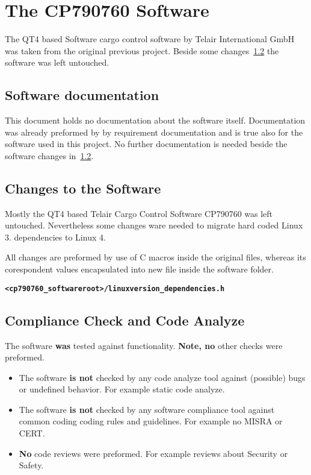 \chapter{The CP790760 Software}%
\label{cha:software}
The QT4 based Software cargo control software by Telair International GmbH was
taken from the original previous project. Beside some
changes~\ref{sec:software_changes} the software was left untouched.

\section{Software documentation}%
\label{sec:Software_documentation}
This document holds no documentation about the software itself. Documentation
was already preformed by by requirement documentation and is true also for the
software used in this project. No further documentation is needed beside the
software changes in~\ref{sec:software_changes}.


\section{Changes to the Software}%
\label{sec:software_changes}
Mostly the QT4 based Telair Cargo Control Software CP790760 was left untouched.
Nevertheless some changes ware needed to migrate hard coded Linux 3.\@
dependencies to Linux 4.


All changes are preformed by use of C macros inside the original files, whereas
its corespondent values encapsulated into new file inside the software folder.
\footnotemark[1]

\begin{alltt}
    \textbf{<cp790760\_softwareroot>/\textbf{linuxversion\_dependencies.h}}
\end{alltt}

\section{Compliance Check and Code Analyze}%
\label{sec:software_anaylse}

The software \textbf{was} tested against functionality. \textbf{Note, no}
other checks were preformed.

\begin{itemize}
    \item The software \textbf{is not} checked by any code analyze tool against
        (possible) bugs or undefined behavior. For example static code analyze.
    \item The software \textbf{is not} checked by any software compliance tool
        against common coding coding rules and guidelines. For example no MISRA
        or CERT.\@
    \item \textbf{No} code reviews were preformed. For example reviews about
        Security or Safety.
\end{itemize}


